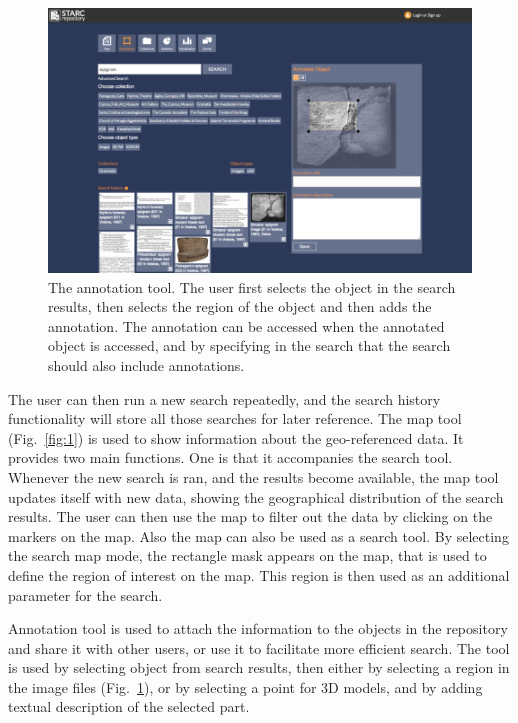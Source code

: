 \documentclass[amsthm,ebook]{saparticle}
\begin{document}
\begin{figure}[!hbp]
\centering
 \includegraphics[width=\columnwidth]{DamnjanovicetalEAGLE2016-img002.png}
\caption{The annotation tool. The user first selects the object in the search results, then selects the region of the
object and then adds the annotation. The annotation can be accessed when the annotated object is accessed, and by
specifying in the search that the search should also include annotations. }
\label{fig:2}
\end{figure}

The user can then run a new search repeatedly, and the search history functionality
will store all those searches for later reference. The map tool (Fig.~\ref{fig:1}) is used to show information about the
geo-referenced data. It provides two main functions. One is that it accompanies the search tool. Whenever the new
search is ran, and the results become available, the map tool updates itself with new data, showing the geographical distribution of the search results. The user can then use the map to filter out the data by clicking on the
markers on the map. Also the map can also be used as a search tool. By selecting the search map mode, the rectangle
mask appears on the map, that is used to define the region of interest on the map. This region is then used as an
additional parameter for the search. 



Annotation tool is used to attach the information to the objects in the repository and share it with other users, or use
it to facilitate more efficient search. The tool is used by selecting object from search results, then either by
selecting a region in the image files (Fig.~\ref{fig:2}), or by selecting a point for 3D models, and by adding textual description
of the selected part. 
\end{document}
